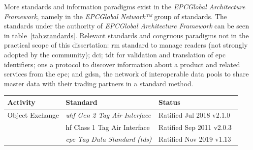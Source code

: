 More standards and information paradigms exist in the \emph{EPCGlobal Architecture Framework}, namely in the \emph{EPCGlobal Network™} group of standards. The standards under the authority of \emph{EPCGlobal Architecture Framework} can be seen in table~\ref{tab:standards}. Relevant standards and congruous paradigms not in the practical scope of this dissertation: \acf{rm} standard to manage readers (not strongly adopted by the community); \acf{dci}; \acf{tdt} for validation and translation of \ac{epc} identifiers; \ac{ons} a protocol to discover information about a product and related services from the \ac{epc}; and \acf{gdsn}, the network of interoperable data pools to share master data with their trading partners in a standard method. 

\begin{table}[]
    \begin{adjustwidth}{-0.09\textwidth}{0em}
    \begin{tabular}{|l|l|l|}
    \hline
    \textbf{Activity}                                                                       & \textbf{Standard}                                                                                                                                           & \textbf{Status}                                                                                                                                                                                                                \\ \hline
    Object Exchange                                                       & \emph{\acs{uhf} Gen 2 Tag Air Interface}                                                                                                          & Ratified Jul 2018 v2.1.0~\cite{UHFGen2Tag}                                                                                                                                                                        \\ \cline{2-3} 
                                                                                            & \acs{hf} Class 1 Tag Air Interface                                                                                                         & Ratified Sep 2011 v2.0.3~\cite{HFClassTag}                                                                                                                                                                        \\ \cline{2-3} 
                                                                                            & \emph{\acs{epc} Tag Data Standard (\acs{tds})}                                                                                               & Ratified Nov 2019 v1.13~\cite{EPCTagData}                                                                                                                                               \\ \cline{1-1}

\end{tabular}
\end{adjustwidth}
\end{table}
